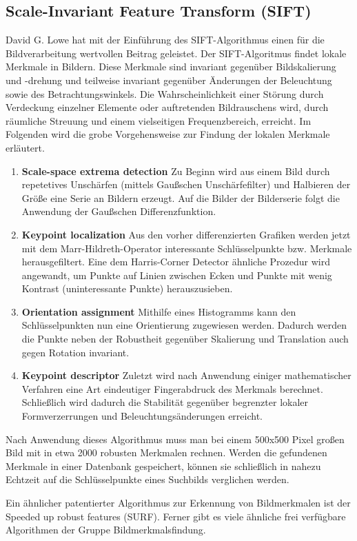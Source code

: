 \subsection{Scale-Invariant Feature Transform (SIFT)}
David G. Lowe hat mit der Einführung des SIFT-Algorithmus einen für die
Bildverarbeitung wertvollen Beitrag geleistet. Der SIFT-Algoritmus findet lokale
Merkmale in Bildern. Diese Merkmale sind invariant gegenüber Bildskalierung und
-drehung und teilweise invariant gegenüber Änderungen der Beleuchtung sowie des
Betrachtungswinkels. Die Wahrscheinlichkeit einer Störung durch Verdeckung
einzelner Elemente oder auftretenden Bildrauschens wird, durch räumliche
Streuung und einem vielseitigen Frequenzbereich, erreicht. Im Folgenden wird die
grobe Vorgehensweise zur Findung der lokalen Merkmale erläutert. 

\begin{enumerate}
    \item \textbf{Scale-space extrema detection}\newline
    Zu Beginn wird aus einem Bild durch repetetives Unschärfen (mittels
    Gaußschen Unschärfefilter) und Halbieren der Größe eine Serie an Bildern
    erzeugt. Auf die Bilder der Bilderserie folgt die Anwendung der Gaußschen
    Differenzfunktion.
    \item \textbf{Keypoint localization}\newline
    Aus den vorher differenzierten Grafiken werden jetzt mit dem
    Marr-Hildreth-Operator interessante Schlüsselpunkte bzw. Merkmale 
    herausgefiltert. Eine dem Harris-Corner Detector ähnliche Prozedur wird
    angewandt, um Punkte auf Linien zwischen Ecken und Punkte mit wenig
    Kontrast (uninteressante Punkte) herauszusieben.
    \item \textbf{Orientation assignment}\newline
    Mithilfe eines Histogramms kann den Schlüsselpunkten nun eine Orientierung
    zugewiesen werden. Dadurch werden die Punkte neben der Robustheit gegenüber
    Skalierung und Translation auch gegen Rotation invariant.
    \item \textbf{Keypoint descriptor}\newline
    Zuletzt wird nach Anwendung einiger mathematischer Verfahren eine Art
    eindeutiger Fingerabdruck des Merkmals berechnet. Schließlich wird dadurch
    die Stabilität gegenüber begrenzter lokaler Formverzerrungen und
    Beleuchtungsänderungen erreicht.
\end{enumerate}

Nach Anwendung dieses Algorithmus muss man bei einem 500x500 Pixel großen Bild
mit in etwa 2000 robusten Merkmalen rechnen. Werden die gefundenen Merkmale in
einer Datenbank gespeichert, können sie schließlich in nahezu Echtzeit auf die
Schlüsselpunkte eines Suchbilds verglichen werden.

Ein ähnlicher patentierter Algorithmus zur Erkennung von Bildmerkmalen ist der
\glqq{}Speeded up robust features (SURF)\grqq{}. Ferner gibt es viele ähnliche
frei verfügbare Algorithmen der Gruppe \glqq{}Bildmerkmalsfindung\grqq{}.